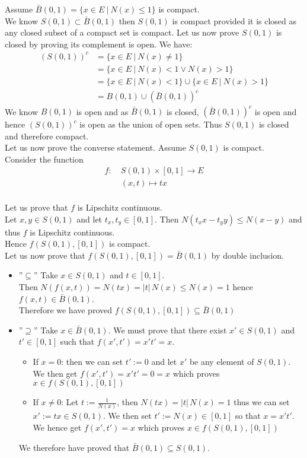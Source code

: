 \documentclass{article}
\begin{document}
\noindent Assume $\bar{B}(0,1) = \{ x \in E \ | \ N(x) \leq 1 \}$ is compact. \\
We know $S(0, 1) \subset \bar{B}(0,1)$ then $S(0,1)$ is compact provided it is closed as any closed subset of a compact set is compact. Let us now prove $S(0, 1)$ is closed by proving its complement is open. We have:
\begin{align*}
	(S(0,1))^c &= \{ x\in E \ | \ N(x) \neq 1 \} \\
	&=  \{ x\in E \ | \ N(x) < 1 \lor N(x) > 1 \} \\
	&= \{ x\in E \ | \ N(x) < 1 \} \cup \{ x\in E \ | \ N(x) > 1 \} \\
	&= B(0, 1) \cup (\bar{B}(0, 1))^c 
\end{align*}
We know $B(0,1)$ is open and as $\bar{B}(0, 1)$ is closed, $ (\bar{B}(0, 1))^c$ is open and hence $(S(0,1))^c$ is open as the union of open sets. Thus  $S(0, 1)$ is closed and therefore compact. \\

\noindent Let us now prove the converse statement. Assume $S(0, 1)$ is compact. \\

\noindent Consider the function 
\begin{align*} 
f  : \  & S(0,1) \times [0,1]  \to  E \\
  & (x,t)  \mapsto  tx 
\end{align*} \\
Let us prove that $f$ is Lipschitz continuous. \\
Let $x, y \in S(0,1) $ and let $t_x, t_y \in [0,1]$. Then $N(t_xx-t_yy) \leq N(x-y)$ and thus $f$ is Lipschitz continuous. \\
Hence $f(S(0,1), [0,1])$ is compact. \\

\noindent Let us now prove that $f(S(0,1), [0,1]) = \bar{B}(0,1)$ by double inclusion.
\begin{itemize}
\item ''$\subseteq$'' 
Take $x \in S(0,1)$ and $t \in [0,1]$. \\
Then $N(f(x,t)) = N(tx) = |t| \, N(x) \leq N(x) = 1$ hence $f(x, t) \in \bar{B}(0,1)$. \\
 Therefore we have proved $f(S(0,1), [0,1]) \subseteq \bar{B}(0,1)$
\item ''$\supseteq$''
Take $x \in \bar{B}(0,1)$. We must prove that there exist $x' \in S(0,1)$ and $t' \in [0,1]$ such that $f(x', t') = x't' = x$. 
	\begin{itemize}
	\item If $x=0$:
	then we can set $t' :=0$ and let $x'$ be any element of $S(0,1)$. 
	We then get $f(x', t') = x't' = 0 = x$ which proves $x \in f(S(0,1), [0,1])$ 
	\item If $x \neq 0$:
	Let $t := \frac{1}{N(x)}$, then $N(tx) = |t| \, N(x) = 1$ thus we can set $x' := tx \in S(0,1)$. 
	We then set $t' := N(x) \in [0,1]$ so that $x = x't'$. 
	We hence get $f(x', t') = x$ which proves $x \in f(S(0,1), [0,1])$ 
	\end{itemize}
We therefore have proved that $\bar{B}(0,1) \subseteq S(0,1)$. 
\end{itemize}
\end{document}
